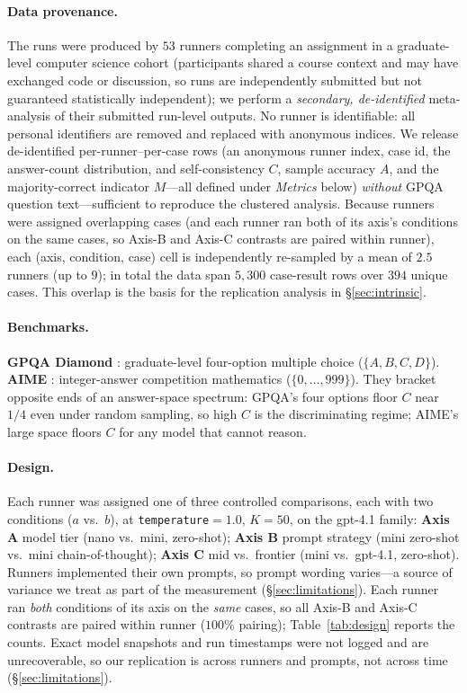 \documentclass[11pt]{article}
\newcommand{\C}{\textit{C}}
\newcommand{\A}{\textit{A}}
\newcommand{\Mlab}{\textit{M}}
\begin{document}
\paragraph{Data provenance.} The runs were produced by $53$ runners completing
an assignment in a graduate-level computer science cohort (participants shared a course context and may have exchanged code or
discussion, so runs are independently submitted but not guaranteed statistically independent); we
perform a \emph{secondary, de-identified} meta-analysis
of their submitted run-level outputs. No runner is identifiable: all personal identifiers are
removed and replaced with anonymous indices. We release de-identified per-runner--per-case rows
(an anonymous runner index, case id, the answer-count distribution, and self-consistency $\C$, sample accuracy $\A$, and the majority-correct indicator $\Mlab$---all defined under \emph{Metrics} below) \emph{without}
GPQA question text---sufficient to reproduce the clustered analysis. Because
runners were assigned overlapping cases (and each runner ran both of its axis's conditions on the same
cases, so Axis-B and Axis-C contrasts are paired within runner), each (axis, condition, case) cell is
independently re-sampled by a mean of $2.5$ runners (up to $9$); in total the data span $5{,}300$ case-result rows
over $394$ unique cases. This overlap is the basis for the replication analysis in
\S\ref{sec:intrinsic}.

\paragraph{Benchmarks.} \textbf{GPQA Diamond} \citep{rein2024gpqa}: graduate-level four-option
multiple choice ($\{A,B,C,D\}$). \textbf{AIME} \citep{aime}: integer-answer competition mathematics
($\{0,\dots,999\}$). They bracket opposite ends of an answer-space spectrum: GPQA's four options
floor $\C$ near $1/4$ even under random sampling, so high $\C$ is the discriminating regime;
AIME's large space floors $\C$ for any model that cannot reason.

\paragraph{Design.} Each runner was assigned one of three controlled comparisons, each with two
conditions ($a$ vs.\ $b$), at \texttt{temperature}$=1.0$, $K{=}50$, on the gpt-4.1 family:
\textbf{Axis A} model tier (nano vs.\ mini, zero-shot); \textbf{Axis B} prompt strategy (mini
zero-shot vs.\ mini chain-of-thought); \textbf{Axis C} mid vs.\ frontier (mini vs.\ gpt-4.1,
zero-shot). Runners implemented their own prompts, so prompt wording varies---a source of variance
we treat as part of the measurement (\S\ref{sec:limitations}). Each runner ran \emph{both} conditions
of its axis on the \emph{same} cases, so all Axis-B and Axis-C contrasts are paired within runner
($100\%$ pairing); Table~\ref{tab:design} reports the counts. Exact model snapshots and run timestamps
were not logged and are unrecoverable, so our replication is across runners and prompts, not across time
(\S\ref{sec:limitations}).
\end{document}
